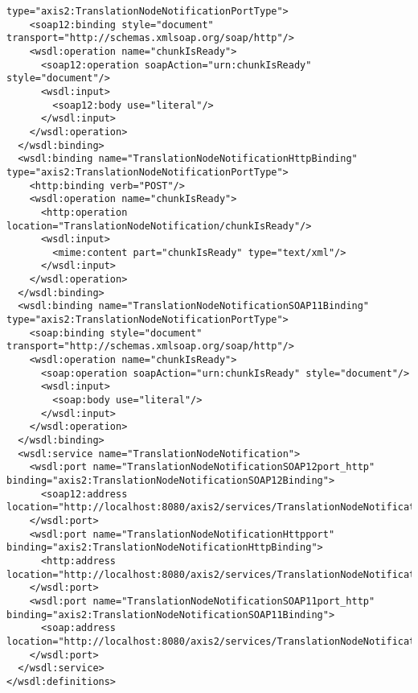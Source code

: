 \begin{verbatim}
type="axis2:TranslationNodeNotificationPortType">
    <soap12:binding style="document"
transport="http://schemas.xmlsoap.org/soap/http"/>
    <wsdl:operation name="chunkIsReady">
      <soap12:operation soapAction="urn:chunkIsReady" style="document"/>
      <wsdl:input>
        <soap12:body use="literal"/>
      </wsdl:input>
    </wsdl:operation>
  </wsdl:binding>
  <wsdl:binding name="TranslationNodeNotificationHttpBinding"
type="axis2:TranslationNodeNotificationPortType">
    <http:binding verb="POST"/>
    <wsdl:operation name="chunkIsReady">
      <http:operation location="TranslationNodeNotification/chunkIsReady"/>
      <wsdl:input>
        <mime:content part="chunkIsReady" type="text/xml"/>
      </wsdl:input>
    </wsdl:operation>
  </wsdl:binding>
  <wsdl:binding name="TranslationNodeNotificationSOAP11Binding"
type="axis2:TranslationNodeNotificationPortType">
    <soap:binding style="document"
transport="http://schemas.xmlsoap.org/soap/http"/>
    <wsdl:operation name="chunkIsReady">
      <soap:operation soapAction="urn:chunkIsReady" style="document"/>
      <wsdl:input>
        <soap:body use="literal"/>
      </wsdl:input>
    </wsdl:operation>
  </wsdl:binding>
  <wsdl:service name="TranslationNodeNotification">
    <wsdl:port name="TranslationNodeNotificationSOAP12port_http"
binding="axis2:TranslationNodeNotificationSOAP12Binding">
      <soap12:address
location="http://localhost:8080/axis2/services/TranslationNodeNotification"/>
    </wsdl:port>
    <wsdl:port name="TranslationNodeNotificationHttpport"
binding="axis2:TranslationNodeNotificationHttpBinding">
      <http:address
location="http://localhost:8080/axis2/services/TranslationNodeNotification"/>
    </wsdl:port>
    <wsdl:port name="TranslationNodeNotificationSOAP11port_http"
binding="axis2:TranslationNodeNotificationSOAP11Binding">
      <soap:address
location="http://localhost:8080/axis2/services/TranslationNodeNotification"/>
    </wsdl:port>
  </wsdl:service>
</wsdl:definitions>
\end{verbatim} 

